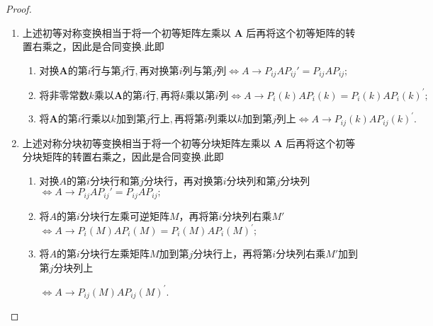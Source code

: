 \documentclass[../../main.tex]{subfiles}
\begin{document}
\begin{proof}
\begin{enumerate}
\item 上述初等对称变换相当于将一个初等矩阵左乘以 $\boldsymbol{A}$ 后再将这个初等矩阵的转置右乘之，因此是合同变换.此即
\begin{enumerate}[(1)]
\item $\text{对换}\boldsymbol{A}\text{的第}i\text{行与第}j\text{行},\text{再对换第}i\text{列与第}j\text{列} \iff A\rightarrow P_{ij}AP_{ij}'=P_{ij}AP_{ij};$

\item $\text{将非零常数}k\text{乘以}\boldsymbol{A}\text{的第}i\text{行},\text{再将}k\text{乘以第}i\text{列}\Longleftrightarrow A\rightarrow P_i\left( k \right) AP_{i}\left( k \right)= P_i\left( k \right) AP_{i}\left( k \right)^{\prime};$

\item $\text{将}\boldsymbol{A}\text{的第}i\text{行乘以}k\text{加到第}j\text{行上},\text{再将第}i\text{列乘以}k\text{加到第}j\text{列上}\Longleftrightarrow A\rightarrow P_{ij}\left( k \right) AP_{ij}\left( k \right)^{\prime} .$
\end{enumerate}

\item 上述对称分块初等变换相当于将一个初等分块矩阵左乘以 $\boldsymbol{A}$ 后再将这个初等分块矩阵的转置右乘之，因此是合同变换.此即
\begin{enumerate}[(1)]
\item 对换\(A\)的第\(i\)分块行和第\(j\)分块行，再对换第\(i\)分块列和第\(j\)分块列$\iff A\rightarrow P_{ij}AP_{ij}'=P_{ij}AP_{ij};$

\item 将\(A\)的第\(i\)分块行左乘可逆矩阵\(M\)，再将第\(i\)分块列右乘\(M'\)$\Longleftrightarrow A\rightarrow P_i\left( M \right) AP_{i}\left( M \right)= P_i\left( M \right) AP_{i}\left( M \right)^{\prime};$

\item 将\(A\)的第\(i\)分块行左乘矩阵\(M\)加到第\(j\)分块行上，再将第\(i\)分块列右乘\(M'\)加到第\(j\)分块列上

$\Longleftrightarrow A\rightarrow P_{ij}\left( M \right) AP_{ij}\left( M \right)^{\prime} .$
\end{enumerate}
\end{enumerate}
\end{proof}
\end{document}
